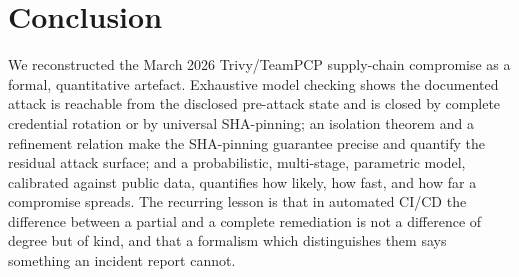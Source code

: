 \documentclass[letterpaper,twocolumn,10pt]{article}
\begin{document}
\section{Conclusion}
We reconstructed the March 2026 Trivy/TeamPCP supply-chain compromise as a formal, quantitative artefact. Exhaustive model checking shows the documented attack is reachable from the disclosed pre-attack state and is closed by complete credential rotation or by universal SHA-pinning; an isolation theorem and a refinement relation make the SHA-pinning guarantee precise and quantify the residual attack surface; and a probabilistic, multi-stage, parametric model, calibrated against public data, quantifies how likely, how fast, and how far a compromise spreads. The recurring lesson is that in automated CI/CD the difference between a partial and a complete remediation is not a difference of degree but of kind, and that a formalism which distinguishes them says something an incident report cannot.
\end{document}
